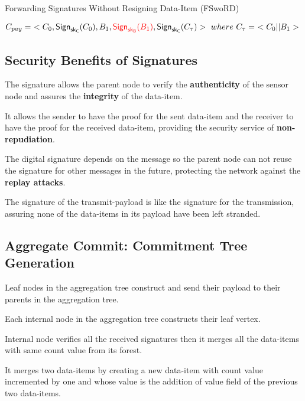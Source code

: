 \documentclass[%
  slidesonly,%
  semlayer%
  ]{seminar}                                  %
\newcommand{\sk}{\sf{sk}}
\begin{document}
\begin{slide}
      Forwarding Signatures Without Resigning Data-Item (FSwoRD)
      \begin{tiny}
      \begin{equation*}
          C_{pay} =\ <C_{0}, \textsf{Sign}_{\sk_{C}}(C_{0}), B_{1}, \textcolor{red}{\textsf{Sign}_{\sk_{B}}(B_{1})}, \textsf{Sign}_{\sk_{C}}(C_{\tau}) >\ where\ C_{\tau} =\ <C_{0} || B_{1}>\\
      \end{equation*}
      \end{tiny}
      
      \vfill
      \clearpage

    \subsection*{Security Benefits of Signatures}
      \vfill
      The signature allows the parent node to verify the \textbf{authenticity} of the sensor node and assures the \textbf{integrity} of the data-item.

      It allows the sender to have the proof for the sent data-item and the receiver to have the proof for the received data-item, providing the security service of \textbf{non-repudiation}.

      The digital signature depends on the message so the parent node can not reuse the signature for other messages in the future, protecting the network against the \textbf{replay attacks}.

      The signature of the transmit-payload is like the signature for the transmission, assuring none of the data-items in its payload have been left stranded.

      \vfill
      \clearpage

    \subsection*{Aggregate Commit: Commitment Tree Generation}
    
      Leaf nodes in the aggregation tree construct and send their payload to their parents in the aggregation tree.  
      
      Each internal node in the aggregation tree constructs their leaf vertex.
  
      Internal node verifies all the received signatures then it merges all the data-items with same count value from its forest.

      It merges two data-items by creating a new data-item with count value incremented by one and whose value is the addition of value field of the previous two data-items. 


\end{slide}
\end{document}
